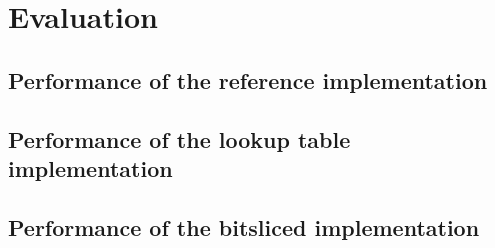 \section{Evaluation}
\subsection{Performance of the reference implementation}
\subsection{Performance of the lookup table implementation}
\subsection{Performance of the bitsliced implementation}